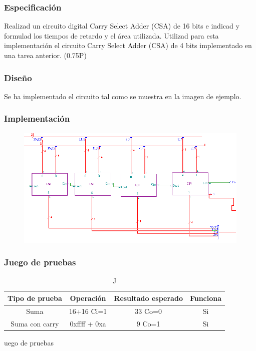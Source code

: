 \documentclass{article}
\begin{document}
		\subsubsection*{Especificación}
		Realizad un circuito digital Carry Select Adder (CSA) de 16 bits e indicad y formulad
		los tiempos de retardo y el área utilizada. Utilizad para esta implementación el circuito Carry Select
		Adder (CSA) de 4 bits implementado en una tarea anterior. (0.75P)


		\subsubsection*{Diseño}
		Se ha implementado el circuito tal como se muestra en la imagen de ejemplo.


		\subsubsection*{Implementación}
		 \begin{figure}[ht]
		 	\includegraphics[width=0.8\linewidth]{CSA16}
			\centering
		 \end{figure}


		\subsubsection*{Juego de pruebas}
		\begin{table}[h]
			\begin{center}
				\begin{tabular}{| c | c | c | c |}
					\hline
					Tipo de prueba & Operación & Resultado esperado & Funciona \\ \hline
					
					Suma & 16+16 Ci=1 & 33 Co=0 & Si \\ \hline
					Suma con carry & 0xffff + 0xa & 9 Co=1 & Si \\ \hline
				\end{tabular}
				\caption Juego de pruebas
			\end{center}
		\end{table}
\end{document}
